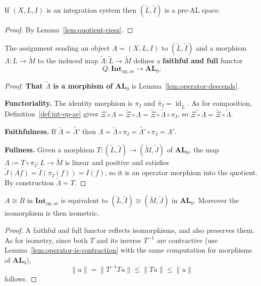 \begin{lemma}\label{lem:quotient-is-preAL}
  If $(X,L,I)$ is an integration system then
  $(\widetilde{L},\widetilde{I})$ is a pre-AL space.
\end{lemma}
\begin{proof}
  By Lemma~\ref{lem:quotient-riesz}.
\end{proof}

\begin{proposition}\label{prop:Q-full-faithful}
  The assignment sending an object $A=(X,L,I)$ to
  $(\widetilde{L},\widetilde{I})$ and a morphism $\Lambda:L\to\widetilde{M}$ to
  the induced map $\widetilde{\Lambda}:\widetilde{L}\to\widetilde{M}$ defines a
  \textbf{faithful and full} functor
  \[
    Q:\mathbf{Int}_{\mathrm{op},\mathrm{ae}}\longrightarrow\mathbf{AL}_0 .
  \]
\end{proposition}
\begin{proof}
  \textbf{That $\widetilde{\Lambda}$ is a morphism of $\mathbf{AL}_0$} is
  Lemma~\ref{lem:operator-descends}.

  \textbf{Functoriality.}
  The identity morphism is $\pi_I$ and
  $\widetilde{\pi_I}=\operatorname{id}_{\widetilde{L}}$.
  As for composition, Definition~\ref{def:int-op-ae} gives
  $\Xi\circ\Lambda=\widetilde{\Xi}\circ\Lambda
  =\widetilde{\Xi}\circ\widetilde{\Lambda}\circ\pi_I$, so
  $\widetilde{\Xi\circ\Lambda}=\widetilde{\Xi}\circ\widetilde{\Lambda}$.

  \textbf{Faithfulness.}
  If $\widetilde{\Lambda}=\widetilde{\Lambda'}$ then
  $\Lambda=\widetilde{\Lambda}\circ\pi_I=\widetilde{\Lambda'}\circ\pi_I=\Lambda'$.

  \textbf{Fullness.}
  Given a morphism
  $T:(\widetilde{L},\widetilde{I})\to(\widetilde{M},\widetilde{J})$ of
  $\mathbf{AL}_0$, the map $\Lambda:=T\circ\pi_I:L\to\widetilde{M}$ is linear
  and positive and satisfies
  $\widetilde{J}(\Lambda f)=\widetilde{I}(\pi_I(f))=I(f)$, so it is an operator
  morphism into the quotient.
  By construction $\widetilde{\Lambda}=T$.
\end{proof}

\begin{corollary}\label{cor:op-ae-iso-criterion}
  $A\cong B$ in $\mathbf{Int}_{\mathrm{op},\mathrm{ae}}$ is equivalent to
  $(\widetilde{L},\widetilde{I})\cong(\widetilde{M},\widetilde{J})$ in
  $\mathbf{AL}_0$.
  Moreover the isomorphism is then isometric.
\end{corollary}
\begin{proof}
  A faithful and full functor reflects isomorphisms, and also preserves them.
  As for isometry, since both $T$ and its inverse $T^{-1}$ are contractive (use
  Lemma~\ref{lem:operator-is-contraction} with the same computation for
  morphisms of $\mathbf{AL}_0$),
  \[
    \|u\|=\|T^{-1}Tu\|\le\|Tu\|\le\|u\|
  \]
  follows.
\end{proof}

